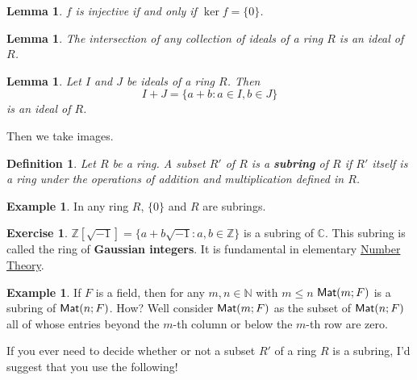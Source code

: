 \documentclass[11pt]{amsbook}
\newtheorem{definition}[theorem]{Definition}
\newtheorem{lemma}[theorem]{Lemma}
\theoremstyle{definition}
\newtheorem{ex}[theorem]{Example}
\newtheorem{exercise}{Exercise}
\begin{document}
\begin{lemma} \label{injring} $f$ is injective if and only if $\ker f = \{ 0 \}$. \end{lemma}

\begin{lemma} \label{intideal} The intersection of any collection of ideals of a ring $R$ is an ideal of $R$. \end{lemma}

\begin{lemma} Let $I$ and $J$ be ideals of a ring $R$. Then $$I+J = \{ a+ b: a\in I, b\in J\}$$ is an ideal of $R$. \end{lemma}

Then we take images.

\begin{definition} Let $R$ be a ring. A subset $R'$ of $R$ is a \textbf{subring} of $R$ if $R'$ itself is a ring under the operations of addition and multiplication defined in $R$.
\end{definition}

\begin{ex}
In any ring $R$, $\{0\}$ and $R$ are subrings.
\end{ex}
\begin{exercise}
$\mathbb{Z}[\sqrt{-1}] = \{ a + b\sqrt{-1} : a,b \in \mathbb{Z} \}$
is a subring of $\mathbb{C}$. This subring is called the ring of {\bf Gaussian integers}. It is fundamental in elementary \href{http://www.drps.ed.ac.uk/11-12/dpt/cxmath10036.htm}{Number Theory}.
\end{exercise}
\begin{ex}
\label{submatrices}
If $F$ is a field, then for any $m,n\in \mathbb{N}$ with $m\leqslant n$ ${\sf Mat}(m; F)$ is a
subring of ${\sf Mat}(n; F)$. How? Well consider ${\sf Mat}(m;F )$ as the subset of ${\sf Mat}(n;F)$ all of whose entries beyond the $m$-th
column or below the $m$-th row are zero.
\end{ex}

If you ever need to decide whether or not a subset $R'$ of a ring $R$ is a subring, I'd suggest that you use the following!
\end{document}
